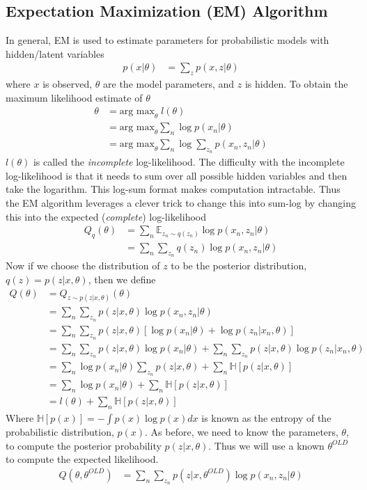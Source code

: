 \documentclass[11pt]{article}
\newcommand{\ProbOpr}[1]{\mathbb{#1}}
\begin{document}
\subsection{Expectation Maximization (EM) Algorithm}
In general, EM is used to estimate parameters for probabilistic models with hidden/latent variables
\begin{align*}
p(x|\theta) &= \sum_z p(x,z|\theta)
\end{align*}
where $x$ is observed, $\theta$ are the model parameters, and $z$ is hidden. To obtain the maximum likelihood estimate of $\theta$
\begin{align*}
\theta &= \text{arg max}_\theta \; l(\theta)\\
 &= \text{arg max}_\theta \sum_n \log p(x_n|\theta)\\
&= \text{arg max}_\theta \sum_n \log \sum_{z_n} p(x_n, z_n|\theta)
\end{align*}
$l(\theta)$ is called the {\it incomplete} log-likelihood. The difficulty with the incomplete log-likelihood is that it needs to sum over all possible hidden variables and then take the logarithm. This log-sum format makes computation intractable. Thus the EM algorithm leverages a clever trick to change this into sum-log by changing this into the expected ({\it complete}) log-likelihood
\begin{align*}
Q_q(\theta) &= \sum_n \ProbOpr{E}_{z_n \sim q(z_n)} \log p(x_n, z_n | \theta) \\
&= \sum_n \sum_{z_n} q(z_n)\log p(x_n, z_n | \theta)
\end{align*}
Now if we choose the distribution of $z$ to be the posterior distribution, $q(z) = p(z|x,\theta)$, then we define
\begin{align*}
Q(\theta) &= Q_{z \sim p(z|x, \theta)}(\theta)\\
&= \sum_n \sum_{z_n} p(z|x, \theta) \log p(x_n, z_n | \theta)\\
&= \sum_n \sum_{z_n} p(z|x, \theta)[ \log p(x_n | \theta) + \log p(z_n| x_n, \theta)]\\
&= \sum_n \sum_{z_n} p(z|x, \theta) \log p(x_n | \theta) + \sum_n \sum_{z_n} p(z|x, \theta)\log p(z_n| x_n, \theta)\\
&= \sum_n  \log p(x_n | \theta) \sum_{z_n}p(z|x, \theta)+ \sum_n\ProbOpr{H}[p(z|x, \theta)]\\
&= \sum_n  \log p(x_n | \theta)+ \sum_n\ProbOpr{H}[p(z|x, \theta)]\\
&=  l(\theta)+ \sum_n\ProbOpr{H}[p(z|x, \theta)]
\end{align*}
Where $\ProbOpr{H}[p(x)] = - \int p(x) \log p(x) dx$ is known as the entropy of the probabilistic distribution, $p(x)$. As before, we need to know the parameters, $\theta$, to compute the posterior probability $p(z|x, \theta)$. Thus we will use a known $\theta^{OLD}$ to compute the expected likelihood.
\begin{align*}
Q(\theta,\theta^{OLD} )&= \sum_n \sum_{z_n} p(z|x, \theta^{OLD}) \log p(x_n, z_n | \theta)
\end{align*}
\end{document}
